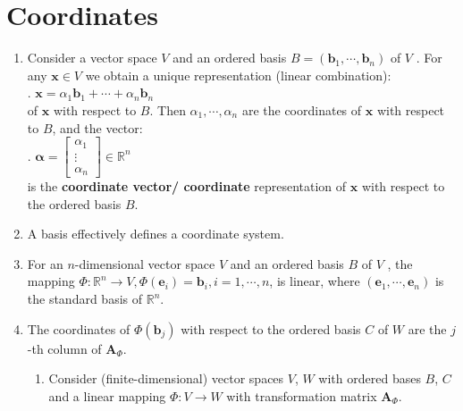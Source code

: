 \section{Coordinates}

\begin{enumerate}
    \item Consider a vector space $V$ and an ordered basis $B = (\bm{b}_1, \cdots , \bm{b}_n)$ of $V$ . 
    For any $\bm{x} \in V$ we obtain a unique representation (linear combination):
    \hfill \cite{mfml/book/mml/Deisenroth-Faisal-Ong}
    \\
    .\hfill
    $
        \bm{x} = \alpha_1 \bm{b}_1 + \cdots + \alpha_n \bm{b}_n
    $
    \hfill \cite{mfml/book/mml/Deisenroth-Faisal-Ong}
    \\
    of $\bm{x}$ with respect to $B$. 
    Then $\alpha_1, \cdots , \alpha_n$ are the coordinates of $\bm{x}$ with respect to $B$, and the vector:
    \hfill \cite{mfml/book/mml/Deisenroth-Faisal-Ong}
    \\
    .\hfill
    $
        \bm{\alpha} = \begin{bmatrix}
            \alpha_1 \\
            \vdots \\
            \alpha_n
        \end{bmatrix}
        \in \mathbb{R}^n
    $
    \hfill \cite{mfml/book/mml/Deisenroth-Faisal-Ong}
    \\
    is the \textbf{coordinate vector/ coordinate} representation of $\bm{x}$ with respect to the ordered basis $B$.
    \hfill \cite{mfml/book/mml/Deisenroth-Faisal-Ong}

    \item A basis effectively defines a coordinate system.
    \hfill \cite{mfml/book/mml/Deisenroth-Faisal-Ong}

    \item For an $n$-dimensional vector space $V$ and an ordered basis $B$ of $V$ , the mapping $\Phi : \mathbb{R}^n \to V , \Phi(\bm{e}_i) = \bm{b}_i , i = 1, \cdots , n$, is linear, where $(\bm{e}_1, \cdots , \bm{e}_n)$ is the standard basis of $\mathbb{R}^n$.
    \hfill \cite{mfml/book/mml/Deisenroth-Faisal-Ong}

    \item The coordinates of $\Phi(\bm{b}_j )$ with respect to the ordered basis $C$ of $W$ are the $j$-th column of $\bm{A}_\Phi$.
    \hfill \cite{mfml/book/mml/Deisenroth-Faisal-Ong}
    \hfill \cite{mfml/book/mml/Deisenroth-Faisal-Ong}
    \begin{enumerate}
        \item Consider (finite-dimensional) vector spaces $V$, $W$ with ordered bases $B$, $C$ and a linear mapping $\Phi : V \to W$ with transformation matrix $\bm{A}_\Phi$.
        \hfill \cite{mfml/book/mml/Deisenroth-Faisal-Ong}


\end{enumerate}
\end{enumerate}

